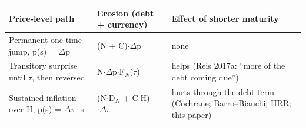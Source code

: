 \begin{center}
\footnotesize
\begin{tabularx}{\textwidth}{>{\raggedright\arraybackslash}X>{\raggedright\arraybackslash}X>{\raggedright\arraybackslash}X}
\toprule
Price-level path & Erosion (debt + currency) & Effect of shorter maturity \\
\midrule
Permanent one-time jump, p(s) = $\Delta$p & (N + C)$\cdot\Delta$p & none \\
Transitory surprise until $\tau$, then reversed & N$\cdot\Delta$p$\cdot$F$_{N}$($\tau$) & helps (Reis 2017a: ``more of the debt coming due'') \\
Sustained inflation over H, p(s) = $\Delta\pi\cdot$s & (N$\cdot$D$_{N}$ + C$\cdot$H)$\cdot\Delta\pi$ & hurts through the debt term (Cochrane; Barro–Bianchi; HRR; this paper) \\
\bottomrule
\end{tabularx}
\end{center}
